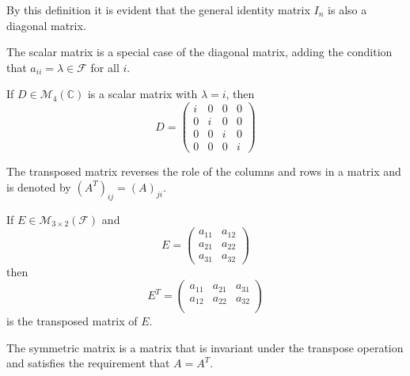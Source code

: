 \begin{exm}
	By this definition it is evident that the general identity matrix $I_n$ is
	also a diagonal matrix.
\end{exm}

\begin{definition}\label{def-scalar-matrix}
	The scalar matrix is a special case of the diagonal matrix, adding the condition
	that $a_{ii} = \lambda\in\mathcal{F}$ for all $i$.
\end{definition}

\begin{exm}
	If $D\in\mathcal{M}_4(\mathbb{C})$ is a scalar matrix with $\lambda = i$,
	then
	\begin{equation*}
		D = \begin{pmatrix}
			i & 0 & 0 & 0 \\
			0 & i & 0 & 0 \\
			0 & 0 & i & 0 \\
			0 & 0 & 0 & i
		\end{pmatrix}
	\end{equation*}
\end{exm}

\begin{definition}\label{def-transposed-matrix}
	The transposed matrix reverses the role of the columns and rows in a matrix
	and is denoted by $(A^T)_{ij}=(A)_{ji}$.
\end{definition}

\begin{exm}
	If $E\in\mathcal{M}_{3 \times 2}(\mathcal{F})$ and
	\begin{equation*}
		E = \begin{pmatrix}
			a_{11} & a_{12} \\
			a_{21} & a_{22} \\
			a_{31} & a_{32}
		\end{pmatrix}
	\end{equation*}
	then
	\begin{equation*}
		E^T = \begin{pmatrix}
			a_{11} & a_{21} & a_{31} \\
			a_{12} & a_{22} & a_{32} \\
		\end{pmatrix}
	\end{equation*}
	is the transposed matrix of $E$.
\end{exm}

\begin{definition}\label{def-symmetric-matrix}
	The symmetric matrix is a matrix that is invariant under the transpose operation
	and satisfies the requirement that $A=A^T$.
\end{definition}

